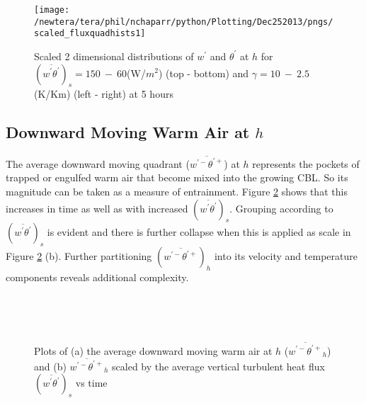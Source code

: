 \begin{figure}[htbp]
\centering
 \texttt{[image: /newtera/tera/phil/nchaparr/python/Plotting/Dec252013/pngs/scaled\_fluxquadhists1]}                 
\caption[Scaled 2D distributions of $w^{'}$ and $\theta^{'}$ for all runs]{Scaled 2 dimensional distributions of $w^{'}$ and $\theta^{'}$ at $h$ for $(\overline{w^{'}\theta^{'}})_{s} = 150 \ - \ 60$(W/$m^{2}$) (top - bottom) and $\gamma = 10 \ - \  2.5$(K/Km) (left - right) at 5 hours}
\label{fig:scaled_fluxquadsh1}
\end{figure}


\clearpage

\subsection{Downward Moving Warm Air at $h$}
\label{subsec:downwarm}

The average downward moving quadrant ($\overline{w^{'-}\theta^{'+}}$) at $h$ represents the pockets of trapped or engulfed warm air that become mixed into the growing \acs{CBL}.  So its magnitude can be taken as a measure of entrainment.  Figure \ref{fig:downwarm} shows that this increases in time as well as with increased $(\overline{w^{'}\theta^{'}})_{s}$.  Grouping according to $(\overline{w^{'}\theta^{'}})_{s}$ is evident and there is further collapse when this is applied as scale in Figure \ref{fig:downwarm} (b).  Further partitioning $(\overline{w^{'-}\theta^{'+}})_{h}$ into its velocity and temperature components reveals additional complexity.\\

\begin{figure}[htbp]
\begin{minipage}[b]{0.5\linewidth}
        \\
        \end{minipage}             
\quad
\begin{minipage}[b]{0.5\linewidth}
        \\
     
       \end{minipage}
        \caption[Downward moving warm air at $h$]{Plots of (a) the average downward moving warm air at $h$ ($\overline{w^{\prime-}\theta^{\prime+}}_{h}$) and (b) $\overline{w^{\prime-}\theta^{\prime+}}_{h}$ scaled by the average vertical turbulent heat flux $(\overline{w^{\prime}\theta^{\prime}})_{s}$ vs time}
        \label{fig:downwarm}
\end{figure}\\

